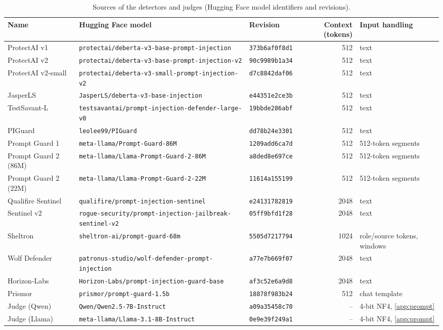 \begin{table}[t]
\centering\small
\caption{Sources of the detectors and judges (Hugging Face model identifiers and revisions).}
\label{tab:sources}
\scriptsize
\begin{tabular*}{\textwidth}{@{\extracolsep{\fill}}lllrl@{}}
\toprule
Name & Hugging Face model & Revision & Context (tokens) & Input handling \\
\midrule
ProtectAI v1 & \texttt{protectai/deberta-v3-base-prompt-injection} & \texttt{373b6af0f8d1} & 512 & text \\
ProtectAI v2 & \texttt{protectai/deberta-v3-base-prompt-injection-v2} & \texttt{90c9989b1a34} & 512 & text \\
ProtectAI v2-small & \texttt{protectai/deberta-v3-small-prompt-injection-v2} & \texttt{d7c8842daf06} & 512 & text \\
JasperLS & \texttt{JasperLS/deberta-v3-base-injection} & \texttt{e44351e2ce3b} & 512 & text \\
TestSavant-L & \texttt{testsavantai/prompt-injection-defender-large-v0} & \texttt{19bbde286abf} & 512 & text \\
PIGuard & \texttt{leolee99/PIGuard} & \texttt{dd78b24e3301} & 512 & text \\
Prompt Guard 1 & \texttt{meta-llama/Prompt-Guard-86M} & \texttt{1209add6ca7d} & 512 & 512-token segments \\
Prompt Guard 2 (86M) & \texttt{meta-llama/Llama-Prompt-Guard-2-86M} & \texttt{a8ded8e697ce} & 512 & 512-token segments \\
Prompt Guard 2 (22M) & \texttt{meta-llama/Llama-Prompt-Guard-2-22M} & \texttt{11614a155199} & 512 & 512-token segments \\
Qualifire Sentinel & \texttt{qualifire/prompt-injection-sentinel} & \texttt{e24131782819} & 2048 & text \\
Sentinel v2 & \texttt{rogue-security/prompt-injection-jailbreak-sentinel-v2} & \texttt{05ff9bfd1f28} & 2048 & text \\
Sheltron & \texttt{sheltron-ai/prompt-guard-68m} & \texttt{5505d7217794} & 1024 & role/source tokens, windows \\
Wolf Defender & \texttt{patronus-studio/wolf-defender-prompt-injection} & \texttt{a77e7b669f07} & 2048 & text \\
Horizon-Labs & \texttt{Horizon-Labs/prompt-injection-guard-base} & \texttt{af3c52e6a9d8} & 2048 & text \\
Prismor & \texttt{prismor/prompt-guard-1.5b} & \texttt{18878f983b24} & 512 & chat template \\
\midrule
Judge (Qwen) & \texttt{Qwen/Qwen2.5-7B-Instruct} & \texttt{a09a35458c70} & -- & 4-bit NF4, \ref{app:prompt} \\
Judge (Llama) & \texttt{meta-llama/Llama-3.1-8B-Instruct} & \texttt{0e9e39f249a1} & -- & 4-bit NF4, \ref{app:prompt} \\
\bottomrule
\end{tabular*}
\end{table}

